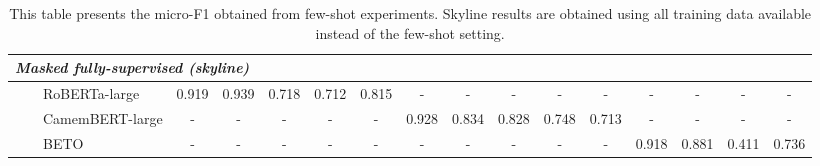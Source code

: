 \begin{table*}[ht]
{{\begin{tabular}{lll|ccccc|ccccc|cccc}
\midrule
\midrule
\multicolumn{17}{l}{\textit{Masked fully-supervised (skyline)}} \\
\midrule
 & & RoBERTa-large & 0.919 & 0.939 & 0.718 & 0.712 & 0.815 & - & - & - & - & - & - & - & - & - \\
 & & CamemBERT-large & - & - & - & - & - & 0.928 & 0.834 & 0.828 & 0.748 & 0.713 & - & - & - & - \\
 & & BETO & - & - & - & - & - & - & - & - & - & - & 0.918 & 0.881 & 0.411 & 0.736 \\
\bottomrule
\end{tabular}}}
\caption{This table presents the micro-F1 obtained from few-shot experiments. Skyline results are obtained using all training data available instead of the few-shot setting.}
\label{tab:results}
\end{table*}
